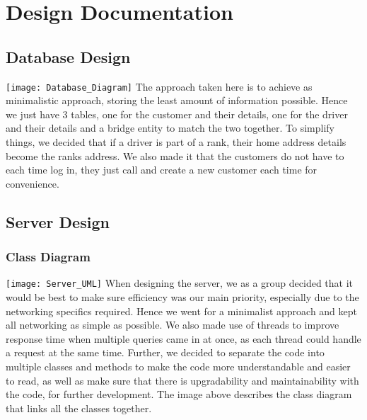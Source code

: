 \documentclass[a4paper,12pt]{article}
\begin{document}
\section{Design Documentation}
\subsection{Database Design}
\texttt{[image: Database\_Diagram]}
The approach taken here is to achieve as minimalistic approach, storing the least amount of information possible. Hence we just have 3 tables, one for the customer and their details, one for the driver and their details and a bridge entity to match the two together. To simplify things, we decided that if a driver is part of a rank, their home address details become the ranks address. We also made it that the customers do not have to each time log in, they just call and create a new customer each time for convenience.

\subsection{Server Design}
\subsubsection{Class Diagram}
\texttt{[image: Server\_UML]}
When designing the server, we as a group decided that it would be best to make sure efficiency was our main priority, especially due to the networking specifics required. Hence we went for a minimalist approach and kept all networking as simple as possible. We also made use of threads to improve response time when multiple queries came in at once, as each thread could handle a request at the same time. Further, we decided to separate the code into multiple classes and methods to make the code more understandable and easier to read, as well as make sure that there is upgradability and maintainability with the code, for further development. The image above describes the class diagram that links all the classes together.
\newpage
\end{document}
